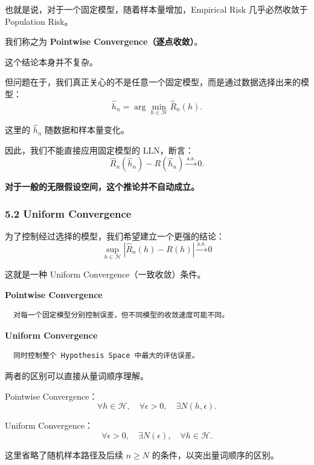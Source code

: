 也就是说，对于一个固定模型，随着样本量增加，Empirical Risk 几乎必然收敛于 Population Risk。

我们称之为 \textbf{Pointwise Convergence（逐点收敛）}。

这个结论本身并不复杂。

但问题在于，我们真正关心的不是任意一个固定模型，而是通过数据选择出来的模型：
\[\hat h_n
=
\arg\min_{h\in\mathcal H}
\widehat R_n(h).\]

这里的 \(\hat h_n\) 随数据和样本量变化。

因此，我们不能直接应用固定模型的 LLN，断言：
\[\widehat R_n(\hat h_n)
-
R(\hat h_n)
\xrightarrow{\mathrm{a.s.}}0.\]

\textbf{对于一般的无限假设空间，这个推论并不自动成立。}

\hypertarget{part-2-12-0001-uniform-convergence}{%
\subsubsection{5.2 Uniform Convergence}\label{part-2-12-0001-uniform-convergence}}

为了控制经过选择的模型，我们希望建立一个更强的结论：
\[\boxed{
\sup_{h\in\mathcal H}
|\widehat R_n(h)-R(h)|
\xrightarrow{\mathrm{a.s.}}0
}\]

这就是一种 Uniform Convergence（一致收敛）条件。

\textbf{Pointwise Convergence}


\begin{verbatim}
  对每一个固定模型分别控制误差，但不同模型的收敛速度可能不同。
\end{verbatim}

\textbf{Uniform Convergence}


\begin{verbatim}
  同时控制整个 Hypothesis Space 中最大的评估误差。
\end{verbatim}

两者的区别可以直接从量词顺序理解。

Pointwise Convergence：
\[\forall h\in\mathcal H,\quad
\forall\epsilon>0,\quad
\exists N(h,\epsilon).\]

Uniform Convergence：
\[\forall\epsilon>0,\quad
\exists N(\epsilon),\quad
\forall h\in\mathcal H.\]

这里省略了随机样本路径及后续 \(n\geq N\) 的条件，以突出量词顺序的区别。

